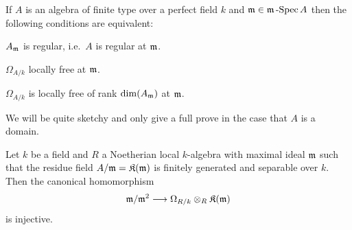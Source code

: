 \documentclass[a4paper,parskip=half,numbers=enddot, DIV=12]{scrreprt}
\begin{document}
\begin{prop}
    If $A$ is an algebra of finite type over a perfect field $k$ and $\mathfrak{m}\in\mathfrak{m}\operatorname{-Spec} A$ then the following conditions are equivalent:
    \begin{alphanumerate}
      \item 
        $A_{\mathfrak{m}}$ is regular, i.e.\ $A$ is regular at $\mathfrak{m}$.
      \item 
        $\Omega_{A/k}$ locally free at $\mathfrak{m}$.
      \item 
        $\Omega_{A/k}$ is locally free of rank $\dim(A_{\mathfrak{m}})$ at $\mathfrak{m}$.
    \end{alphanumerate}
\end{prop}
We will be quite sketchy and only give a full prove in the case that $A$ is a domain.
\begin{lem}
	Let $k$ be a field and $R$ a Noetherian local $k$-algebra with maximal ideal $\mathfrak{m}$ such that the residue field $A/\mathfrak{m}=\mathfrak{K}(\mathfrak{m})$ is finitely generated and separable over $k$. Then the canonical homomorphism
	\begin{align*}
		\mm/\mm^2\morphism\Omega_{R/k}\otimes_R\KK(\mm)
	\end{align*}
	is injective.
\end{lem}
\end{document}
